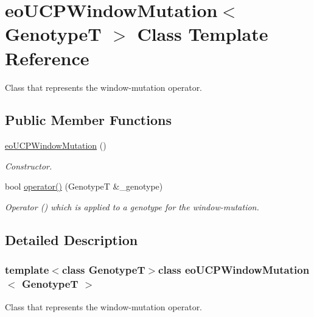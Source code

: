 \hypertarget{classeo_u_c_p_window_mutation}{\section{eo\-U\-C\-P\-Window\-Mutation$<$ \-Genotype\-T $>$ \-Class \-Template \-Reference}
\label{classeo_u_c_p_window_mutation}
}


\-Class that represents the window-\/mutation operator.  


\subsection*{\-Public \-Member \-Functions}
\begin{DoxyCompactItemize}
\item 
\hyperlink{classeo_u_c_p_window_mutation_a35f31f2bc6532e760c12dccd3146f8ec}{eo\-U\-C\-P\-Window\-Mutation} ()
\begin{DoxyCompactList}\small\item\em \-Constructor. \end{DoxyCompactList}\item 
bool \hyperlink{classeo_u_c_p_window_mutation_a3af2891b7a7af42c8bb2729f88cdb83c}{operator()} (\-Genotype\-T \&\-\_\-genotype)
\begin{DoxyCompactList}\small\item\em \-Operator () which is applied to a genotype for the window-\/mutation. \end{DoxyCompactList}\end{DoxyCompactItemize}


\subsection{\-Detailed \-Description}
\subsubsection*{template$<$class Genotype\-T$>$class eo\-U\-C\-P\-Window\-Mutation$<$ Genotype\-T $>$}

\-Class that represents the window-\/mutation operator. 

